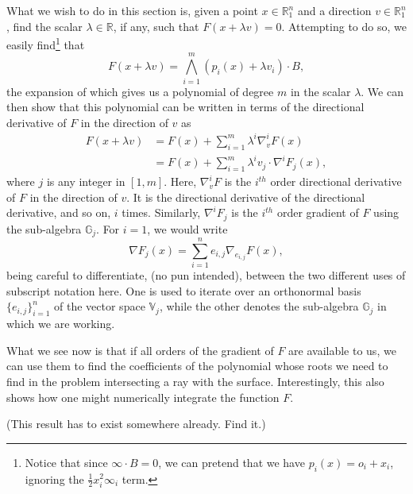 \documentclass{birkjour}
\theoremstyle{definition}
\theoremstyle{remark}
\numberwithin{equation}{section}
\newcommand{\R}{\mathbb{R}}
\newcommand{\G}{\mathbb{G}}
\newcommand{\V}{\mathbb{V}}
\newcommand{\nvai}{\infty}
\newcommand{\nvao}{o}
\begin{document}
What we wish to do in this section is, given a point $x\in\R_1^n$ and a
direction $v\in\R_1^n$, find the scalar $\lambda\in\R$, if any, such that
$F(x+\lambda v)=0$.  Attempting to do so, we easily find\footnote{Notice that
since $\nvai\cdot B=0$, we can pretend that we have $p_i(x)=\nvao_i+x_i$,
ignoring the $\frac{1}{2}x_i^2\nvai_i$ term.} that
\begin{equation*}
F(x+\lambda v) = \bigwedge_{i=1}^m (p_i(x)+\lambda v_i)\cdot B,
\end{equation*}
the expansion of which gives us a polynomial of degree $m$ in the scalar $\lambda$.
We can then show that this polynomial can be written in terms of the directional derivative of $F$
in the direction of $v$ as
\begin{align*}
F(x+\lambda v) &= F(x) + \sum_{i=1}^m \lambda^i\nabla_v^i F(x) \\
 &= F(x) + \sum_{i=1}^m \lambda^i v_j\cdot\nabla^i F_j(x),
\end{align*}
where $j$ is any integer in $[1,m]$.
Here, $\nabla_v^i F$ is the $i^{th}$ order directional derivative of $F$ in the direction of $v$.
It is the directional derivative of the directional derivative, and so on, $i$ times.  Similarly,
$\nabla^i F_j$ is the $i^{th}$ order gradient of $F$ using the sub-algebra $\G_j$.
For $i=1$, we would write
\begin{equation*}
\nabla F_j(x) = \sum_{i=1}^n e_{i,j}\nabla_{e_{i,j}}F(x),
\end{equation*}
being careful to differentiate, (no pun intended), between the two different uses
of subscript notation here.  One is used to iterate over an orthonormal basis
$\{e_{i,j}\}_{i=1}^n$ of the vector space $\V_j$,
while the other denotes the sub-algebra $\G_j$ in which we are working.

What we see now is that if all orders of the gradient of $F$ are available to us,
we can use them to find the coefficients of the polynomial whose roots we need
to find in the problem intersecting a ray with the surface.  Interestingly, this
also shows how one might numerically integrate the function $F$.

(This result has to exist somewhere already.  Find it.)
\end{document}
